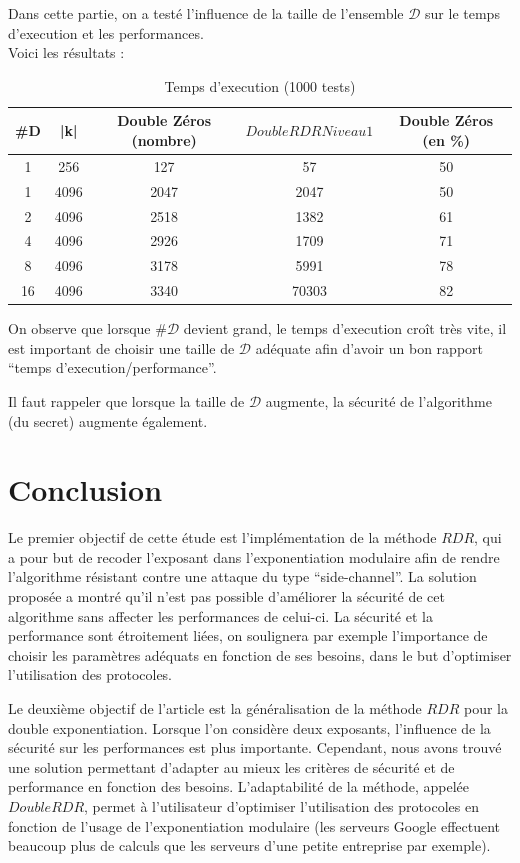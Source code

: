 \documentclass[12pt, a4paper]{memoir}
\begin{document}
Dans cette partie, on a testé l'influence de la taille de l'ensemble $\mathcal{D}$ sur le temps d'execution et les performances. \\
Voici les résultats :
\begin{table}[htbp]
\caption{Temps d'execution (1000 tests) }
\begin{center}
\begin{tabular}{ccccc}
\toprule
\#D & |k| & Double Zéros (nombre) & $DoubleRDR Niveau 1$ & Double Zéros (en \%) \\
\midrule
1 & 256 & 127 & 57 & 50 \\
1 & 4096 & 2047 & 2047 & 50 \\
2 & 4096 & 2518 & 1382 & 61 \\
4 & 4096 & 2926 & 1709 & 71 \\
8 & 4096 & 3178 & 5991 & 78 \\
16 & 4096 & 3340 & 70303 & 82 \\
\bottomrule
\end{tabular}
\end{center}
\label{tab:example}
\end{table}%

On observe que lorsque $\#\mathcal{D}$ devient grand, le temps d'execution croît très vite, il est important 
de choisir une taille de $\mathcal{D}$ adéquate afin d'avoir un bon rapport ``temps d'execution/performance''.

Il faut rappeler que lorsque la taille de $\mathcal{D}$ augmente, la sécurité de l'algorithme (du secret) augmente également.
\chapter{Conclusion}

Le premier objectif de cette étude est l'implémentation de la méthode $RDR$, qui a pour but de recoder l'exposant dans l'exponentiation
modulaire afin de rendre l'algorithme résistant contre une attaque du type ``side-channel''.
La solution proposée a montré qu'il n'est pas possible d'améliorer la sécurité de cet algorithme sans affecter les performances
de celui-ci. La sécurité et la performance sont étroitement liées, on soulignera par exemple l'importance de choisir les paramètres 
adéquats en fonction de ses besoins, dans le but d'optimiser l'utilisation des protocoles.

Le deuxième objectif de l'article est la généralisation de la méthode $RDR$ pour la double exponentiation.
Lorsque l'on considère deux exposants, l'influence de la sécurité sur les performances est plus importante.
Cependant, nous avons trouvé une solution permettant d'adapter au mieux les critères de sécurité et de performance
en fonction des besoins. L'adaptabilité de la méthode, appelée $DoubleRDR$, permet à l'utilisateur d'optimiser
l'utilisation des protocoles en fonction de l'usage de l'exponentiation modulaire (les serveurs Google effectuent
beaucoup plus de calculs que les serveurs d'une petite entreprise par exemple).
\end{document}
